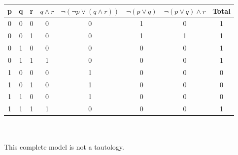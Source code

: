 \begin{large}
\begin{enumerate}[label= (\alph*)]
          \begin{tabular}{c|c|c|c|c|c|c||c}
            p & q & r & $ q \land r $ & $ \neg(\neg p \lor ( q \land r)) $ & $ \neg (p \lor q) $ & $ \neg (p \lor q) \land r $ & Total \\
            \hline\hline
            0 & 0 & 0 & 0             & 0                                  & 1                   & 0                           & 1     \\
            \hline
            0 & 0 & 1 & 0             & 0                                  & 1                   & 1                           & 1     \\
            \hline
            0 & 1 & 0 & 0             & 0                                  & 0                   & 0                           & 1     \\
            \hline
            0 & 1 & 1 & 1             & 0                                  & 0                   & 0                           & 1     \\
            \hline
            1 & 0 & 0 & 0             & 1                                  & 0                   & 0                           & 0     \\
            \hline
            1 & 0 & 1 & 0             & 1                                  & 0                   & 0                           & 0     \\
            \hline
            1 & 1 & 0 & 0             & 1                                  & 0                   & 0                           & 0     \\
            \hline
            1 & 1 & 1 & 1             & 0                                  & 0                   & 0                           & 1     \\
            \hline
          \end{tabular}
          \\ \\
          This complete model is not a tautology.
  \end{enumerate}
\end{large}

